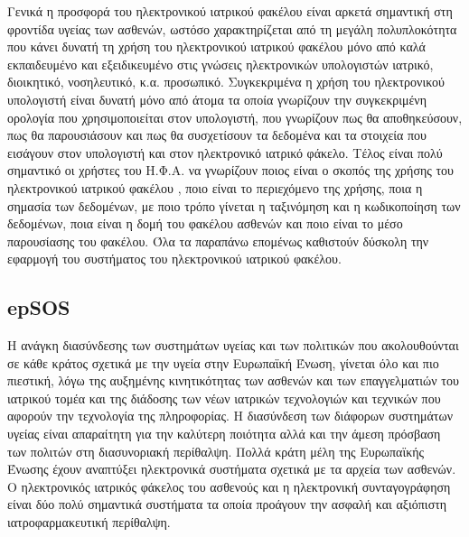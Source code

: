 Γενικά η προσφορά του ηλεκτρονικού ιατρικού φακέλου είναι αρκετά σημαντική στη φροντίδα υγείας των ασθενών, ωστόσο χαρακτηρίζεται από τη μεγάλη πολυπλοκότητα που κάνει δυνατή τη χρήση του ηλεκτρονικού ιατρικού φακέλου μόνο από καλά εκπαιδευμένο και εξειδικευμένο στις γνώσεις ηλεκτρονικών υπολογιστών ιατρικό, διοικητικό, νοσηλευτικό, κ.α. προσωπικό. Συγκεκριμένα η χρήση του ηλεκτρονικού υπολογιστή είναι δυνατή μόνο από άτομα τα οποία γνωρίζουν την συγκεκριμένη ορολογία που χρησιμοποιείται στον υπολογιστή, που γνωρίζουν πως θα αποθηκεύσουν, πως θα παρουσιάσουν και πως θα συσχετίσουν τα δεδομένα και τα στοιχεία που εισάγουν στον υπολογιστή και στον ηλεκτρονικό ιατρικό φάκελο.\cite{hlektronikosIatrikosFakelos} Τέλος είναι πολύ σημαντικό οι χρήστες του Η.Φ.Α. να γνωρίζουν ποιος είναι ο σκοπός της χρήσης του  ηλεκτρονικού ιατρικού φακέλου , ποιο είναι το περιεχόμενο της χρήσης, ποια η σημασία των δεδομένων, με ποιο τρόπο γίνεται η ταξινόμηση και η κωδικοποίηση των δεδομένων, ποια είναι η δομή του φακέλου ασθενών και ποιο είναι το μέσο παρουσίασης του φακέλου. Όλα τα παραπάνω επομένως καθιστούν δύσκολη την εφαρμογή του συστήματος του ηλεκτρονικού ιατρικού φακέλου.

	
	\subsection{epSOS}
	
		Η ανάγκη διασύνδεσης των συστημάτων υγείας και των πολιτικών που ακολουθούνται σε κάθε κράτος σχετικά με την υγεία στην Ευρωπαϊκή Ένωση, γίνεται όλο και πιο πιεστική, λόγω της αυξημένης κινητικότητας των ασθενών και των επαγγελματιών του ιατρικού τομέα και της διάδοσης των νέων ιατρικών τεχνολογιών και τεχνικών που αφορούν την τεχνολογία της πληροφορίας. Η διασύνδεση των διάφορων συστημάτων υγείας είναι απαραίτητη για την καλύτερη ποιότητα αλλά και την άμεση πρόσβαση των πολιτών στη διασυνοριακή περίθαλψη.  Πολλά κράτη μέλη της Ευρωπαϊκής Ένωσης έχουν αναπτύξει ηλεκτρονικά συστήματα σχετικά με τα αρχεία των ασθενών. Ο ηλεκτρονικός ιατρικός φάκελος του ασθενούς και η ηλεκτρονική συνταγογράφηση είναι δύο πολύ σημαντικά συστήματα τα οποία προάγουν την ασφαλή και αξιόπιστη ιατροφαρμακευτική περίθαλψη.	 	
	 	
